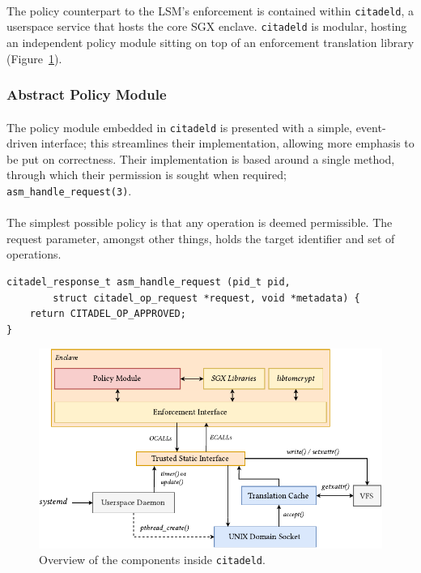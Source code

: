\paragraph{} The policy counterpart to the LSM's enforcement is contained within \texttt{citadeld}, a userspace service that hosts the core SGX enclave. \texttt{citadeld} is modular, hosting an independent policy module sitting on top of an enforcement translation library (Figure~\ref{fig:policy-enclave}).

\subsubsection{Abstract Policy Module}
\paragraph{} The policy module embedded in \texttt{citadeld} is presented with a simple, event-driven interface; this streamlines their implementation, allowing more emphasis to be put on correctness. Their implementation is based around a single method, through which their permission is sought when required; \texttt{asm\_handle\_request(3)}.


\paragraph{} The simplest possible policy is that any operation is deemed permissible. The request parameter, amongst other things, holds the target identifier and set of operations. 

\vspace{3mm}
\begin{verbatim}
citadel_response_t asm_handle_request (pid_t pid, 
        struct citadel_op_request *request, void *metadata) {
    return CITADEL_OP_APPROVED;
}
\end{verbatim}

\begin{figure}[]
    \centering
    \includegraphics[width=0.9\linewidth]{figures/EnclaveLayout.pdf}
    \caption{Overview of the components inside \texttt{citadeld}.}
    \label{fig:policy-enclave}
\end{figure}

